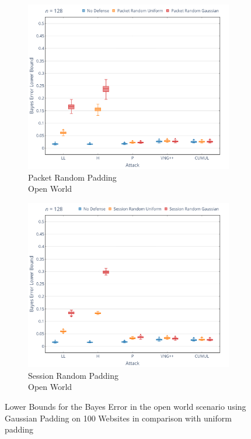 \documentclass[
	ruledheaders=chapter,
	class=report,
	thesis={type=master, department=inf},
	accentcolor=1c,
	custommargins=true,
	marginpar=false,
	parskip=half-,
	fontsize=11pt,
]{tudapub}
\begin{document}
	\begin{figure}[tbp]
		\begin{subfigure}{0.495\textwidth}
			\centering
			\includegraphics[width=\textwidth]{plots/bounds_ow_pkt.png}
			\caption{Packet Random Padding\\Open World}
		\end{subfigure}
		\hfill
		\begin{subfigure}{0.495\textwidth}
			\centering
			\includegraphics[width=\textwidth]{plots/bounds_ow_ses.png}
			\caption{Session Random Padding\\Open World}
		\end{subfigure}
		\caption[Lower Bounds for the Bayes Error in the open world scenario]{Lower Bounds for the Bayes Error in the open world scenario using Gaussian Padding on 100 Websites in comparison with uniform padding}
		\label{fig:bound_ow}
	\end{figure}
\end{document}
